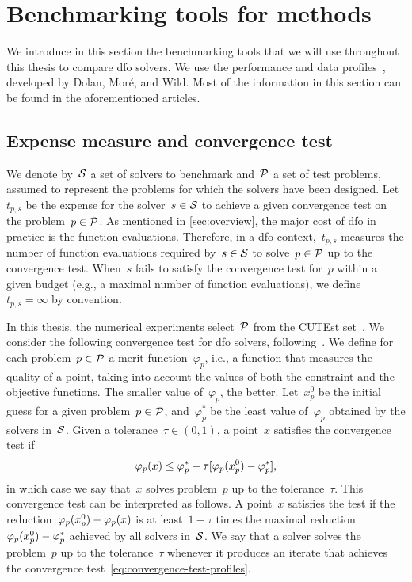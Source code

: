 \section{Benchmarking tools for  methods}
\label{sec:benchmarking-tools}

We introduce in this section the benchmarking tools that we will use throughout this thesis to compare \gls{dfo} solvers.
We use the performance and data profiles~\cite{Dolan_More_2002,More_Wild_2009}, developed by Dolan, Mor{\'{e}}, and Wild.
Most of the information in this section can be found in the aforementioned articles.

\subsection{Expense measure and convergence test}
\label{subsec:convergence-test}

We denote by~$\mathcal{S}$ a set of solvers to benchmark and~$\mathcal{P}$ a set of test problems, assumed to represent the problems for which the solvers have been designed.
Let~$t_{p, s}$ be the expense for the solver~$s \in \mathcal{S}$ to achieve a given convergence test on the problem~$p \in \mathcal{P}$.
As mentioned in \cref{sec:overview}, the major cost of \gls{dfo} in practice is the function evaluations.
Therefore, in a \gls{dfo} context,~$t_{p, s}$ measures the number of function evaluations required by~$s \in \mathcal{S}$ to solve~$p \in \mathcal{P}$ up to the convergence test.
When~$s$ fails to satisfy the convergence test for~$p$ within a given budget (e.g., a maximal number of function evaluations), we define~$t_{p, s} = \infty$ by convention.

In this thesis, the numerical experiments select~$\mathcal{P}$ from the CUTEst set~\cite{Gould_Orban_Toint_2015}.
We consider the following convergence test for \gls{dfo} solvers, following~\cite[\S~2]{More_Wild_2009}.
We define for each problem~$p \in \mathcal{P}$ a merit function~$\varphi_p$, i.e., a function that measures the quality of a point, taking into account the values of both the constraint and the objective functions.
The smaller value of~$\varphi_p$, the better.
Let~$x_p^0$ be the initial guess for a given problem~$p \in \mathcal{P}$, and~$\varphi_p^{\ast}$ be the least value of~$\varphi_p$ obtained by the solvers in~$\mathcal{S}$.
Given a tolerance~$\tau \in (0, 1)$, a point~$x$ satisfies the convergence test if
\begin{equation}
    \label{eq:convergence-test-profiles}
    \varphi_p(\iter) \le \varphi_p^{\ast} + \tau [\varphi_p(\iter_p^0) - \varphi_p^{\ast}],
\end{equation}
in which case we say that~$x$ solves problem~$p$ up to the tolerance~$\tau$.
This convergence test can be interpreted as follows.
A point~$x$ satisfies the test if the reduction~$\varphi_p(\iter_p^0) - \varphi_p(\iter)$ is at least~$1 - \tau$ times the maximal reduction~$\varphi_p(\iter_p^0) - \varphi_p^{\ast}$ achieved by all solvers in~$\mathcal{S}$.
We say that a solver solves the problem~$p$ up to the tolerance~$\tau$ whenever it produces an iterate that achieves the convergence test~\cref{eq:convergence-test-profiles}.


